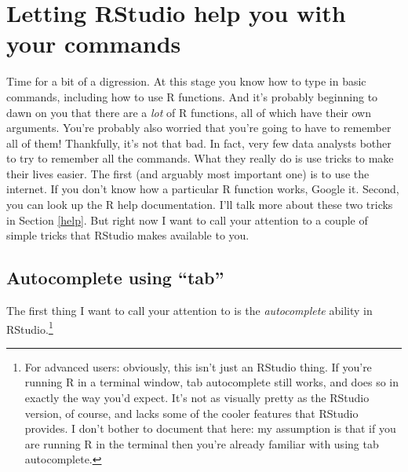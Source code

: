 \documentclass[
]{book}
\begin{document}
\hypertarget{RStudio1}{%
\section{Letting RStudio help you with your commands}\label{RStudio1}}

Time for a bit of a digression. At this stage you know how to type in basic commands, including how to use R functions. And it's probably beginning to dawn on you that there are a \emph{lot} of R functions, all of which have their own arguments. You're probably also worried that you're going to have to remember all of them! Thankfully, it's not that bad. In fact, very few data analysts bother to try to remember all the commands. What they really do is use tricks to make their lives easier. The first (and arguably most important one) is to use the internet. If you don't know how a particular R function works, Google it. Second, you can look up the R help documentation. I'll talk more about these two tricks in Section \ref{help}. But right now I want to call your attention to a couple of simple tricks that RStudio makes available to you.

\hypertarget{autocomplete-using-tab}{%
\subsection{Autocomplete using ``tab''}\label{autocomplete-using-tab}}

The first thing I want to call your attention to is the \emph{autocomplete} ability in RStudio.\footnote{For advanced users: obviously, this isn't just an RStudio thing. If you're running R in a terminal window, tab autocomplete still works, and does so in exactly the way you'd expect. It's not as visually pretty as the RStudio version, of course, and lacks some of the cooler features that RStudio provides. I don't bother to document that here: my assumption is that if you are running R in the terminal then you're already familiar with using tab autocomplete.}
\end{document}
